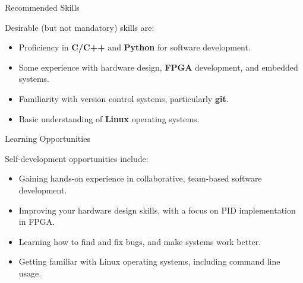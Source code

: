 \documentclass{project-proposal}
\begin{document}
\begin{sectiontwocolumns}
    {Recommended Skills}
    {
        Desirable (but not mandatory) skills are:

        \begin{itemize}
            \item {Proficiency in \textbf{C/C++} and \textbf{Python} for software
                  development.}
            \item {Some experience with hardware design, \textbf{FPGA} development, and
                  embedded systems.}
            \item {Familiarity with version control systems, particularly \textbf{git}.}
            \item {Basic understanding of \textbf{Linux} operating systems.}
        \end{itemize}
    }
    {Learning Opportunities}
    {
        Self-development opportunities include:

        \begin{itemize}
            \item {Gaining hands-on experience in collaborative, team-based
                  software development.}
            \item {Improving your hardware design skills, with a focus on PID
                  implementation in FPGA.}
            \item {Learning how to find and fix bugs, and make systems work better.}
            \item {Getting familiar with Linux operating systems, including
                  command line usage.}
        \end{itemize}
    }
\end{sectiontwocolumns}
\end{document}
